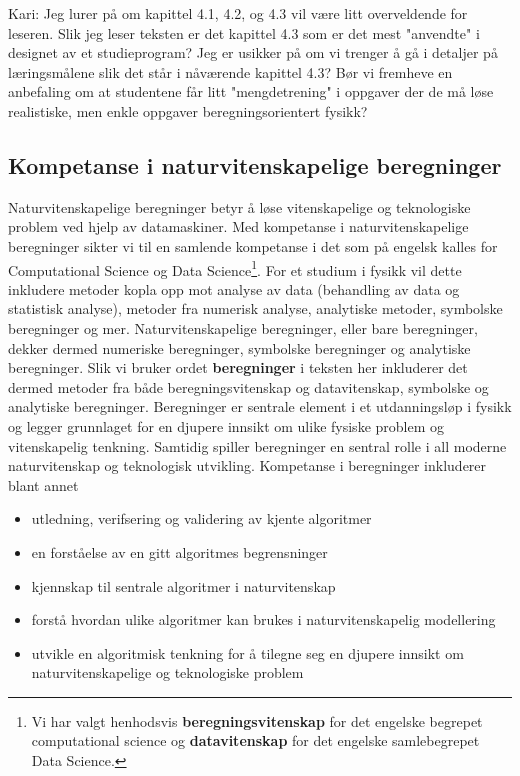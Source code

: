 \documentclass{article}
\begin{document}
{\color{red} Kari: Jeg lurer på om kapittel 4.1, 4.2, og 4.3 vil være litt overveldende for leseren. Slik jeg leser teksten er det kapittel 4.3 som er det mest "anvendte" i designet av et studieprogram? Jeg er usikker på om vi trenger å gå i detaljer på læringsmålene slik det står i nåværende kapittel 4.3? Bør vi fremheve en anbefaling om at studentene får litt "mengdetrening" i oppgaver der de må løse realistiske, men enkle oppgaver beregningsorientert fysikk?}
\subsection{Kompetanse i naturvitenskapelige beregninger}




Naturvitenskapelige beregninger betyr å løse vitenskapelige og teknologiske problem ved hjelp av datamaskiner. 
Med kompetanse i naturvitenskapelige beregninger sikter vi til en samlende kompetanse i det som på engelsk kalles for Computational Science og Data Science\footnote{Vi har valgt henhodsvis {\bf beregningsvitenskap} for det engelske begrepet computational science og {\bf datavitenskap} for det engelske samlebegrepet Data Science.}. For et studium i fysikk vil dette inkludere metoder kopla opp mot analyse av data (behandling av data og statistisk analyse), metoder fra numerisk analyse, analytiske metoder, symbolske beregninger og mer. 
Naturvitenskapelige beregninger, eller bare beregninger, dekker dermed numeriske beregninger, symbolske beregninger og analytiske beregninger. Slik vi bruker ordet {\bf beregninger} i teksten her inkluderer det dermed metoder fra både beregningsvitenskap og datavitenskap, symbolske og analytiske beregninger.  Beregninger er sentrale element i et utdanningsløp i fysikk og legger grunnlaget for en djupere innsikt om ulike fysiske problem og vitenskapelig tenkning. Samtidig spiller beregninger en sentral rolle i all moderne naturvitenskap og teknologisk utvikling. 
Kompetanse i beregninger inkluderer blant annet

\begin{itemize}
  \item utledning, verifsering og validering av kjente algoritmer
  \item en forståelse av en gitt algoritmes begrensninger
  \item kjennskap til sentrale algoritmer i naturvitenskap
  \item forstå hvordan ulike algoritmer kan brukes i naturvitenskapelig modellering
  \item utvikle en algoritmisk tenkning for å tilegne seg en djupere innsikt om naturvitenskapelige og teknologiske problem
\end{itemize}
\end{document}

